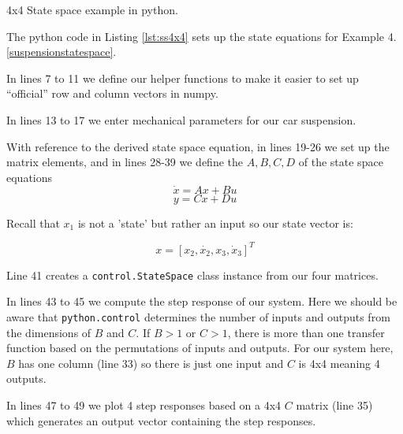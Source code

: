 \begin{Example}
4x4 State space example in python.

The  python code in Listing \ref{lst:ss4x4} sets up the state equations for
Example  4.\ref{suspensionstatespace}.
%


In lines 7 to 11 we define our helper functions to make it easier to set up ``official''
row and column vectors in numpy.

In lines 13 to 17 we enter mechanical parameters for our car suspension.

With reference to the derived state space equation, in lines 19-26 we set
up the matrix elements, and in lines 28-39 we define the $A,B,C,D$ of the
state space equations
\[
\dot{x} = Ax+Bu
\]
\[
y = Cx + Du
\]

Recall that $x_1$ is not a 'state' but rather an input so our state vector is:

\[
x = [x_2,\dot{x_2},x_3,\dot{x}_3]^T
\]

Line 41 creates a {\tt control.StateSpace} class instance from our four matrices.

In lines 43 to 45 we compute the step response of our system.   Here we should be aware
that {\tt python.control} determines the number of inputs and outputs from the dimensions of
$B$ and $C$.   If $B>1$ or $C>1$, there is more than one transfer function based on the
permutations of inputs and outputs.   For our system here, $B$ has one column (line 33) so there
is just one input and $C$ is 4x4 meaning 4 outputs.

In lines 47 to 49 we plot 4 step responses based on a 4x4 $C$ matrix (line 35) which generates
an output vector containing the step responses.
\end{Example}
